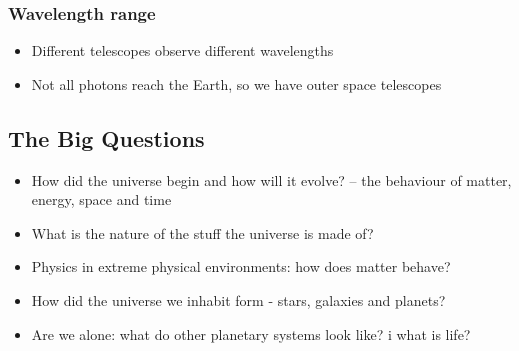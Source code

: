 \documentclass[a4paper]{article} %
\begin{document}
\subsubsection{Wavelength range}
\begin{itemize}
\item Different telescopes observe different wavelengths
\item Not all photons reach the Earth, so we have outer space telescopes
\end{itemize}

\subsection{The Big Questions}
\begin{itemize}
\item How did the universe begin and how will it evolve? – the behaviour of matter, energy, space and time
\item What is the nature of the stuff the universe is made of?
\item Physics in extreme physical environments: how does matter behave?
\item How did the universe we inhabit form - stars, galaxies and planets?
\item Are we alone: what do other planetary systems look like? i what is life?
\end{itemize}

\newpage
\end{document}
